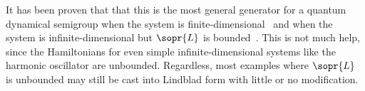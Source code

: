 \documentclass[../thesis.tex]{subfiles}
\begin{document}
It has been proven that that this is the most general generator for a quantum
dynamical semigroup when the system is finite-dimensional~\cite{gks} and when
the system is infinite-dimensional but $\sopr{L}$ is bounded~\cite{lindblad}.
This is not much help, since the Hamiltonians for even simple
infinite-dimensional systems like the harmonic oscillator are unbounded.
Regardless, most examples where $\sopr{L}$ is unbounded may still be cast into
Lindblad form with little or no modification.
\end{document}
